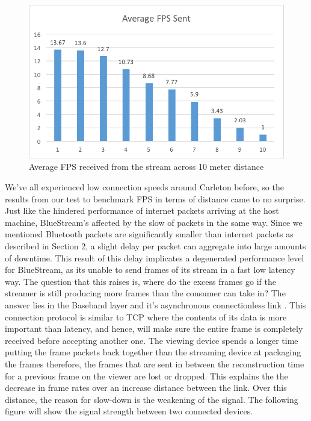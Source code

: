 \documentclass[a4paper,12pt]{article}
\begin{document}
\begin{figure}[h!]
\centering
\includegraphics[scale=1]{Figures/Figure14.png}
\caption{Average FPS received from the stream across 10 meter distance}
\label{fig:AvgFPSdistance}
\end{figure}

We’ve all experienced low connection speeds around Carleton before, so the results from our test to benchmark FPS in terms of distance came to no surprise. Just like the hindered performance of internet packets arriving at the host machine, BlueStream’s affected by the slow of packets in the same way. Since we mentioned Bluetooth packets are significantly smaller than internet packets as described in Section 2, a slight delay per packet can aggregate into large amounts of downtime. This result of this delay implicates a degenerated performance level for BlueStream, as its unable to send frames of its stream in a fast low latency way. The question that this raises is, where do the excess frames go if the streamer is still producing more frames than the consumer can take in? The answer lies in the Baseband layer and it’s asynchronous connectionless link \cite{BTUnifyingTheTelecom}. This connection protocol is similar to TCP where the contents of its data is more important than latency, and hence, will make sure the entire frame is completely received before accepting another one. The viewing device spends a longer time putting the frame packets back together than the streaming device at packaging the frames therefore, the frames that are sent in between the reconstruction time for a previous frame on the viewer are lost or dropped. This explains the the decrease in frame rates over an increase distance between the link. Over this distance, the reason for slow-down is the weakening of the signal. The following figure will show the signal strength between two connected devices.
\end{document}
